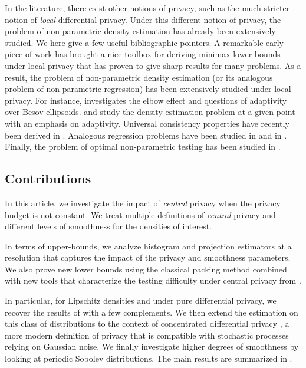 \documentclass[10pt]{article} %
\newcommand\B[1]{{#1}}
\begin{document}
In the literature, \B{there exist other notions of privacy, such as the much stricter notion of \emph{local} differential privacy. Under this different notion of privacy, the problem of non-parametric density estimation has already been extensively studied. We here give a few useful bibliographic pointers.} A remarkable early piece of work \cite{duchi2018minimax} has brought a nice toolbox for deriving minimax lower bounds under local privacy that has proven to give sharp results for many problems. As a result, the problem of non-parametric density estimation (or its analogous problem of non-parametric regression) has been extensively studied under local privacy. For instance, \citet{butucea2020local} investigates the elbow effect and questions of adaptivity over Besov ellipsoids. \citet{kroll2021density} and \citet{schluttenhofer2022adaptive} study the density estimation problem at a given point with an emphasis on adaptivity. Universal consistency properties have recently been derived in \citet{gyorfi2023multivariate}. Analogous regression problems have been studied in \citet{berrett2021strongly} and in \citet{gyorfi2022rate}. Finally, the problem of optimal non-parametric testing has been studied in \citet{lam2022minimax}.


\subsection{Contributions}

In this article, we investigate the impact of \emph{\B{central}} privacy when the privacy budget is not constant. We treat multiple definitions of \emph{\B{central}} privacy and different levels of smoothness for the densities of interest. 

In terms of upper-bounds, we analyze histogram and projection estimators at a resolution that captures the impact of the privacy and smoothness parameters. We also prove new lower bounds using the classical packing method combined with new tools that characterize the testing difficulty under \B{central} privacy from \citet{acharya2021differentially,kamath2022improved,lalanne2022statistical}.

In particular, for Lipschitz densities and under pure differential privacy, we recover the results of \citet{barber2014privacy} with a few complements. 
We then extend the estimation on this class of distributions to the context of concentrated differential privacy \citep{bun2016concentrated}, a more modern definition of privacy that is compatible with stochastic processes relying on Gaussian noise. We finally investigate higher degrees of smoothness by looking at periodic Sobolev distributions.
The main results are summarized in .
\end{document}
